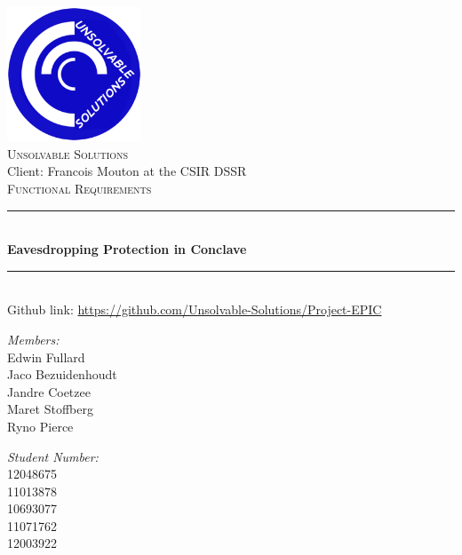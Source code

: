 \newcommand{\HRule}{\rule{\linewidth}{0.5mm}}
\begin{titlepage}
\begin{center}
\includegraphics[width = 0.3\textwidth]{US_newLogo.png}~\\[1cm]
\textsc{\LARGE Unsolvable Solutions}\\
Client: Francois Mouton at the CSIR DSSR\\[1.5cm]
\textsc{\Large  Functional Requirements}\\[0.5cm]

 \HRule\\[0.4cm]
{ \huge \bfseries  Eavesdropping Protection in Conclave \\[0.4cm] }

 \HRule\\ 



Github link:  \url{https://github.com/Unsolvable-Solutions/Project-EPIC} \\[1.2cm]

\noindent
\begin{minipage}[t]{0.4\textwidth}

	\begin{flushleft} \large
	\emph{Members:}\\
		Edwin Fullard  \\
		Jaco Bezuidenhoudt \\
		Jandre Coetzee\\
		Maret Stoffberg\\
		Ryno Pierce\\
	\end{flushleft}
\end{minipage}%
\begin{minipage}[t]{0.4\textwidth}
\begin{flushright} \large
	\emph{Student Number:} \\
		12048675 \\
		11013878 \\
		 10693077 \\
		 11071762 \\
		 12003922\\
	\end{flushright}
\end{minipage}

\vfill






\end{center}
\end{titlepage}




